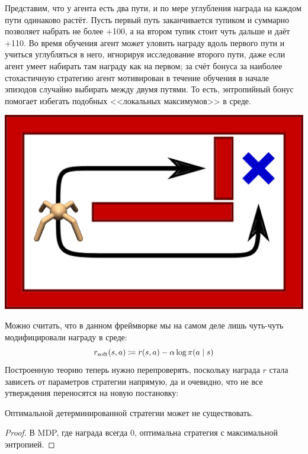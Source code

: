 \begin{exampleBox}[righthand ratio=0.3, sidebyside, sidebyside align=center, lower separated=false]{}
Представим, что у агента есть два пути, и по мере углубления награда на каждом пути одинаково растёт. Пусть первый путь заканчивается тупиком и суммарно позволяет набрать не более +100, а на втором тупик стоит чуть дальше и даёт +110. Во время обучения агент может уловить награду вдоль первого пути и учиться углубляться в него, игнорируя исследование второго пути, даже если агент умеет набирать там награду как на первом; за счёт бонуса за наиболее стохастичную стратегию агент мотивирован в течение обучения в начале эпизодов случайно выбирать между двумя путями. То есть, энтропийный бонус помогает избегать подобных <<локальных максимумов>> в среде.

\tcblower
\includegraphics[width=\textwidth]{Images/twopaths.png}
\end{exampleBox}

Можно считать, что в данном фреймворке мы на самом деле лишь чуть-чуть модифицировали награду в среде:
\begin{equation}\label{softreward}
r_{\mathrm{soft}}(s, a) \coloneqq r(s, a) - \alpha \log \pi(a \mid s)
\end{equation}
Построенную теорию теперь нужно перепроверять, поскольку награда $r$ стала зависеть от параметров стратегии напрямую, да и очевидно, что не все утверждения переносятся на новую постановку:

\begin{proposition}
Оптимальной детерминированной стратегии может не существовать.
\begin{proof}
В MDP, где награда всегда 0, оптимальна стратегия с максимальной энтропией.
\end{proof}
\end{proposition}


